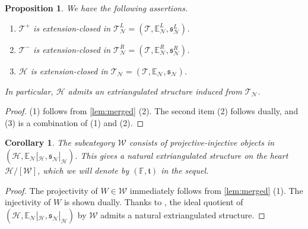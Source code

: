 \documentclass[a4paper,reqno,10pt]{amsart}
\newtheorem{proposition}[proposition]{Proposition}
\newtheorem{corollary}[corollary]{Corollary}
\theoremstyle{definition}
\theoremstyle{definition}
\theoremstyle{definition}
\theoremstyle{definition}
\theoremstyle{plain}
\newcommand{\fs}{\mathfrak{s}}
\newcommand{\ft}{\mathfrak{t}}
\newcommand{\BE}{\mathbb{E}}
\newcommand{\BF}{\mathbb{F}}
\newcommand{\CH}{\mathcal{H}}
\newcommand{\CN}{\mathcal{N}}
\newcommand{\CT}{\mathcal{T}}
\newcommand{\CW}{\mathcal{W}}
\begin{document}
\normalcolor
\begin{proposition}\label{prop:H_is_extension-closed}
We have the following assertions.
\begin{enumerate}[label=\textup{(\arabic*)}]
\item 
$\CT^+$ is extension-closed in $\CT_\CN^L=(\CT,\BE_\CN^L,\fs_\CN^L)$.
\item 
$\CT^-$ is extension-closed in $\CT_\CN^R=(\CT,\BE_\CN^R,\fs_\CN^R)$.
\item 
$\CH$ is extension-closed in $\CT_\CN=(\CT,\BE_\CN,\fs_\CN)$.
\end{enumerate}
In particular, $\CH$ admits an extriangulated structure induced from $\CT_\CN$.
\end{proposition}
\begin{proof}

{\rm (1)} follows from \cref{lem:merged} {\rm (2)}.
\normalcolor
The second item (2) follows dually, and (3) is a combination of (1) and (2).
\end{proof}

\begin{corollary}\label{cor:proj-inj_in_H}
The subcategory $\CW$ consists of projective-injective objects in $(\CH,\BE_\CN|_\CH,\fs_\CN|_\CH)$.
This gives a natural extriangulated structure on the heart $\CH/[\CW]$, which we will denote by $(\BF,\ft)$ in the sequel.
\normalcolor
\end{corollary}
\begin{proof}
The projectivity of $W\in\CW$ immediately follows from \cref{lem:merged} {\rm (1)}. The injectivity of $W$ is shown dually.
\normalcolor
Thanks to \cite[Prop.~3.30]{NP19}, the ideal quotient of $(\CH,\BE_\CN|_\CH,\fs_\CN|_\CH)$ by $\CW$ admits a natural extriangulated structure.
\end{proof}
\end{document}
